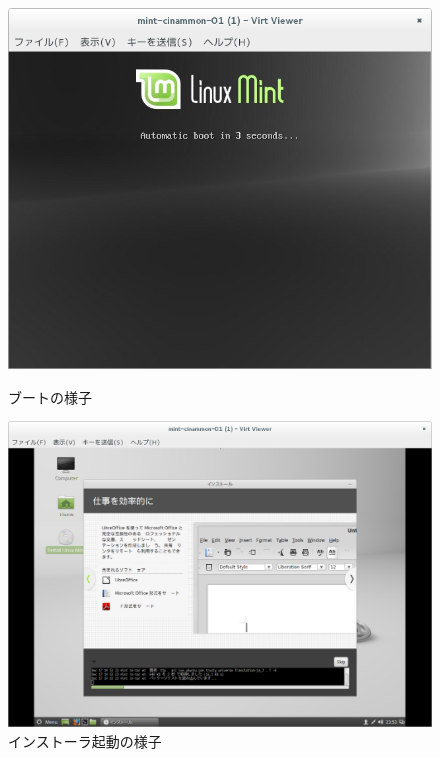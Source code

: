 \documentclass[mingoth,a4paper]{jsarticle}
\begin{document}
\begin{figure}[H]
\begin{minipage}{0.5\hsize}
\centering
\includegraphics[width=0.8\hsize]{image201412/mint-inst-boot.png}
\caption{ブートの様子}\label{fig:mint-boot}
\end{minipage}
\begin{minipage}{0.5\hsize}
\centering
\includegraphics[width=0.8\hsize]{image201412/mint-inst.png}
\caption{インストーラ起動の様子}\label{fig:mint-inst}
\end{minipage}
\end{figure}
\end{document}
